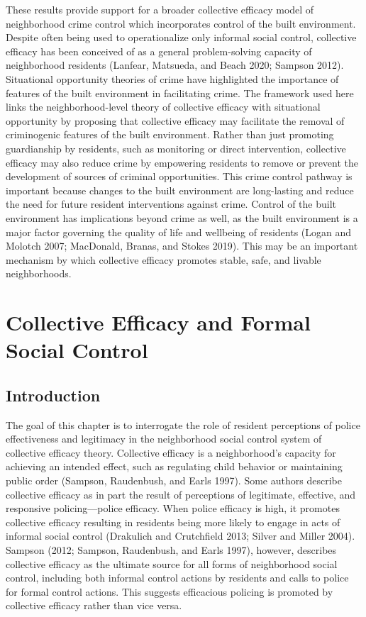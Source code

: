 \documentclass [11pt, proquest] {uwthesis}[2015/03/03]
\begin{document}
These results provide support for a broader collective efficacy model of neighborhood crime control which incorporates control of the built environment. Despite often being used to operationalize only informal social control, collective efficacy has been conceived of as a general problem-solving capacity of neighborhood residents (Lanfear, Matsueda, and Beach 2020; Sampson 2012). Situational opportunity theories of crime have highlighted the importance of features of the built environment in facilitating crime. The framework used here links the neighborhood-level theory of collective efficacy with situational opportunity by proposing that collective efficacy may facilitate the removal of criminogenic features of the built environment. Rather than just promoting guardianship by residents, such as monitoring or direct intervention, collective efficacy may also reduce crime by empowering residents to remove or prevent the development of sources of criminal opportunities. This crime control pathway is important because changes to the built environment are long-lasting and reduce the need for future resident interventions against crime. Control of the built environment has implications beyond crime as well, as the built environment is a major factor governing the quality of life and wellbeing of residents (Logan and Molotch 2007; MacDonald, Branas, and Stokes 2019). This may be an important mechanism by which collective efficacy promotes stable, safe, and livable neighborhoods.

\hypertarget{formalcontrol}{%
\chapter{Collective Efficacy and Formal Social Control}\label{formalcontrol}}

\hypertarget{introduction-3}{%
\section{Introduction}\label{introduction-3}}

The goal of this chapter is to interrogate the role of resident perceptions of police effectiveness and legitimacy in the neighborhood social control system of collective efficacy theory. Collective efficacy is a neighborhood's capacity for achieving an intended effect, such as regulating child behavior or maintaining public order (Sampson, Raudenbush, and Earls 1997). Some authors describe collective efficacy as in part the result of perceptions of legitimate, effective, and responsive policing---police efficacy. When police efficacy is high, it promotes collective efficacy resulting in residents being more likely to engage in acts of informal social control (Drakulich and Crutchfield 2013; Silver and Miller 2004). Sampson (2012; Sampson, Raudenbush, and Earls 1997), however, describes collective efficacy as the ultimate source for all forms of neighborhood social control, including both informal control actions by residents and calls to police for formal control actions. This suggests efficacious policing is promoted by collective efficacy rather than vice versa.
\end{document}
